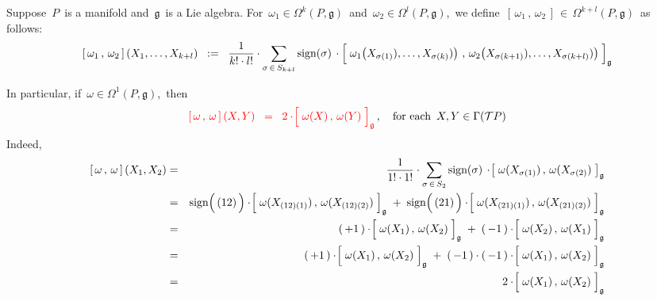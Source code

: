 \vskip 0.5cm
\begin{definition}
\mbox{}
\vskip 0.1cm
\noindent
Suppose \,$P$\, is a {\color{red}manifold} and \,$\mathfrak{g}$\, is a Lie algebra.
For
\,$\omega_{1} \in \Omega^{k}(P,\mathfrak{g})$\,
and
\,$\omega_{2} \in \Omega^{l}(P,\mathfrak{g})$,\,
we define
\,$\left[\,\omega_{1}\,,\,\omega_{2}\,\right] \,\in\, \Omega^{k+l}(P,\mathfrak{g})$\,
as follows:
\begin{equation*}
\left[\,\omega_{1}\,,\,\omega_{2}\,\right](X_{1},\ldots,X_{k+l})
\;\; := \;\;
	\dfrac{1}{k! \cdot l!}\cdot
	\underset{\sigma\,\in\,S_{k+l}}{\sum}\,
	\textnormal{sign}(\sigma)\,\cdot
	\left[\;
		\overset{{\color{white}1}}{\omega_{1}}\!\left(X_{\sigma(1)}),\ldots,X_{\sigma(k)})\right)
		\,,\,
		\omega_{2}\!\left(X_{\sigma(k+1)}),\ldots,X_{\sigma(k+l)})\right)
		\;\right]_{\mathfrak{g}}
\end{equation*}
\end{definition}

\vskip 0.5cm
\begin{remark}\label{BracketEtaEta}
\mbox{}
\vskip 0.1cm
\noindent
In particular, if \,$\omega \in \Omega^{1}(P,\mathfrak{g})$,\, then
\begin{equation*}
{\color{red}
\left[\,\omega\,,\,\omega\,\right](X,Y)
\;\; = \;\;
	2 \cdot\! \left[\;
		\overset{{\color{white}.}}{\omega(X)}
		\,,\,
		\omega(Y)
		\;\right]_{\mathfrak{g}}
}\,,
\quad
\textnormal{for each \,$X, Y \in \Gamma(\mathcal{T}P)$}
\end{equation*}
Indeed,
\begin{eqnarray*}
\left[\,\omega\,,\,\omega\,\right](X_{1},X_{2})
& = &
	\dfrac{1}{1! \cdot 1!}\cdot
	\underset{{\sigma\,\in\,S_{2}}}{\sum}\,
	\textnormal{sign}(\sigma) \,\cdot\!
	\left[\;
		\omega(X_{\sigma(1)})
		\,,\,
		\omega(X_{\sigma(2)})
		\;\right]_{\mathfrak{g}}
\\
& = &
	\textnormal{sign}\!\left(\,\overset{{\color{white}.}}{(12)}\,\right)\cdot\!
	\left[\;
		\overset{{\color{white}.}}{\omega(X_{(12)(1)})}
		\,,\,
		\omega(X_{(12)(2)})
		\;\right]_{\mathfrak{g}}
	\;+\;
	\textnormal{sign}\!\left(\,\overset{{\color{white}.}}{(21)}\,\right)\cdot\!
	\left[\;
		\overset{{\color{white}.}}{\omega(X_{(21)(1)})}
		\,,\,
		\omega(X_{(21)(2)})
		\;\right]_{\mathfrak{g}}
\\
& = &
	\left(\,+1\,\right)\cdot\!
	\left[\;
		\overset{{\color{white}.}}{\omega(X_{1})}
		\,,\,
		\omega(X_{2})
		\;\right]_{\mathfrak{g}}
	\;+\;
	\left(\,-1\,\right)\cdot\!
	\left[\;
		\overset{{\color{white}.}}{\omega(X_{2})}
		\,,\,
		\omega(X_{1})
		\;\right]_{\mathfrak{g}}
\\
& = &
	\left(\,+1\,\right)\cdot\!
	\left[\;
		\overset{{\color{white}.}}{\omega(X_{1})}
		\,,\,
		\omega(X_{2})
		\;\right]_{\mathfrak{g}}
	\;+\;
	\left(\,-1\,\right)\cdot\left(\,-1\,\right)\cdot\!
	\left[\;
		\omega(X_{1})
		\,,\,
		\overset{{\color{white}.}}{\omega(X_{2})}
		\;\right]_{\mathfrak{g}}
\\
& = &
	2\cdot\!
	\left[\;
		\overset{{\color{white}.}}{\omega(X_{1})}
		\,,\,
		\omega(X_{2})
		\;\right]_{\mathfrak{g}}
\end{eqnarray*}
\end{remark}

